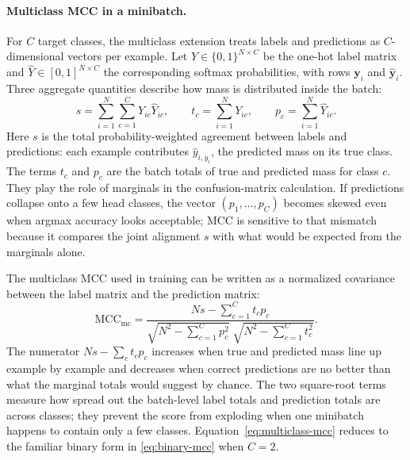 \documentclass[11pt]{article}
\begin{document}
\paragraph{Multiclass MCC in a minibatch.}
For $C$ target classes, the multiclass extension treats labels and predictions as $C$-dimensional vectors per example. Let $Y\in\{0,1\}^{N\times C}$ be the one-hot label matrix and $\widehat{Y}\in[0,1]^{N\times C}$ the corresponding softmax probabilities, with rows $\mathbf{y}_i$ and $\hat{\mathbf{y}}_i$. Three aggregate quantities describe how mass is distributed inside the batch:
\begin{equation}
  s = \sum_{i=1}^{N}\sum_{c=1}^{C} Y_{ic}\widehat{Y}_{ic},
  \qquad
  t_c = \sum_{i=1}^{N} Y_{ic},
  \qquad
  p_c = \sum_{i=1}^{N} \widehat{Y}_{ic}.
  \label{eq:mcc-components}
\end{equation}
\noindent Here $s$ is the total probability-weighted agreement between labels and predictions: each example contributes $\hat{y}_{i,y_i}$, the predicted mass on its true class. The terms $t_c$ and $p_c$ are the batch totals of true and predicted mass for class $c$. They play the role of marginals in the confusion-matrix calculation. If predictions collapse onto a few head classes, the vector $(p_1,\ldots,p_C)$ becomes skewed even when argmax accuracy looks acceptable; MCC is sensitive to that mismatch because it compares the joint alignment $s$ with what would be expected from the marginals alone.

The multiclass MCC used in training can be written as a normalized covariance between the label matrix and the prediction matrix:
\begin{equation}
  \mathrm{MCC}_{\mathrm{mc}} =
  \frac{Ns - \sum_{c=1}^{C} t_c p_c}
       {\sqrt{N^2 - \sum_{c=1}^{C} p_c^2}\;
        \sqrt{N^2 - \sum_{c=1}^{C} t_c^2}}.
  \label{eq:multiclass-mcc}
\end{equation}
\noindent The numerator $Ns-\sum_c t_c p_c$ increases when true and predicted mass line up example by example and decreases when correct predictions are no better than what the marginal totals would suggest by chance. The two square-root terms measure how spread out the batch-level label totals and prediction totals are across classes; they prevent the score from exploding when one minibatch happens to contain only a few classes. Equation~\eqref{eq:multiclass-mcc} reduces to the familiar binary form in \eqref{eq:binary-mcc} when $C=2$.
\end{document}
